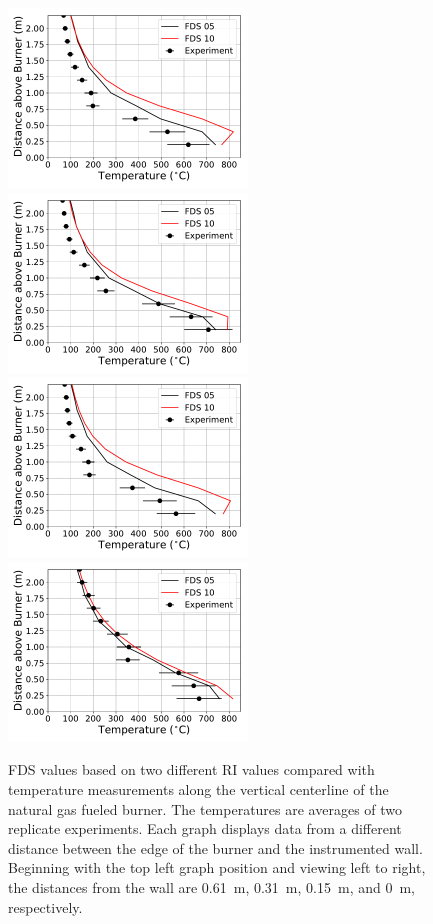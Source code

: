 \documentclass[twoside]{uocthesis}
\begin{document}
{ \begin{figure}[ht!]
  \centering
  \includegraphics[width=2.5in]{../Figures/IWGB_NG_TC_Plume_Avg_2D_RF_RI}
  \includegraphics[width=2.5in]{../Figures/IWGB_NG_TC_Plume_Avg_1D_RF_RI}\\
  \includegraphics[width=2.5in]{../Figures/IWGB_NG_TC_Plume_Avg_0p5D_RF_RI}
  \includegraphics[width=2.5in]{../Figures/IWGB_NG_TC_Plume_Avg_0D_RF_RI}\\
  \caption[FDS values based on two different RI values compared with temperature measurements along the vertical centerline of the natural gas fueled burner]{FDS values based on two different RI values compared with temperature measurements along the vertical centerline of the natural gas fueled burner. The temperatures are averages of two replicate experiments. Each graph displays data from a different distance between the edge of the burner and the instrumented wall.  Beginning with the top left graph position and viewing left to right, the distances from the wall are 0.61~m, 0.31~m, 0.15~m, and 0~m, respectively.}
  \label{FDS_Plume_IWGB_comp}
\end{figure}

}
\end{document}

